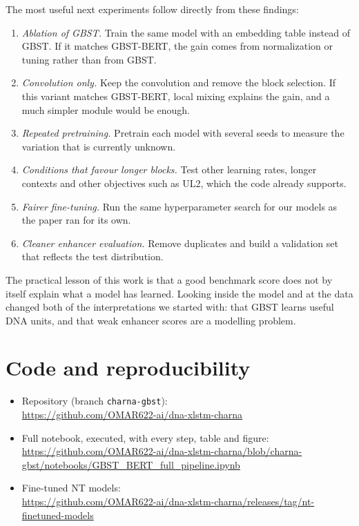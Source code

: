 \documentclass{article}
\newcommand{\repo}{https://github.com/OMAR622-ai/dna-xlstm-charna}
\newcommand{\notebook}{\repo/blob/charna-gbst/notebooks/GBST_BERT_full_pipeline.ipynb}
\begin{document}
The most useful next experiments follow directly from these findings:
\begin{enumerate}
  \item \emph{Ablation of GBST.} Train the same model with an embedding table instead of GBST. If it
  matches GBST-BERT, the gain comes from normalization or tuning rather than from GBST.
  \item \emph{Convolution only.} Keep the convolution and remove the block selection. If this variant
  matches GBST-BERT, local mixing explains the gain, and a much simpler module would be enough.
  \item \emph{Repeated pretraining.} Pretrain each model with several seeds to measure the variation
  that is currently unknown.
  \item \emph{Conditions that favour longer blocks.} Test other learning rates, longer contexts and
  other objectives such as UL2, which the code already supports.
  \item \emph{Fairer fine-tuning.} Run the same hyperparameter search for our models as the paper ran
  for its own.
  \item \emph{Cleaner enhancer evaluation.} Remove duplicates and build a validation set that reflects
  the test distribution.
\end{enumerate}

The practical lesson of this work is that a good benchmark score does not by itself explain what a model
has learned. Looking inside the model and at the data changed both of the interpretations we started
with: that GBST learns useful DNA units, and that weak enhancer scores are a modelling problem.

\section*{Code and reproducibility}

{\raggedright
\begin{itemize}
  \item Repository (branch \texttt{charna-gbst}):\\ {\small\url{\repo}}
  \item Full notebook, executed, with every step, table and figure:\\
  {\small\url{\notebook}}
  \item Fine-tuned NT models:\\ {\small\url{\repo/releases/tag/nt-finetuned-models}}
\end{itemize}
}
\end{document}

